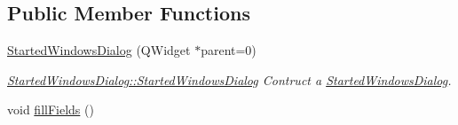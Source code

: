 \subsection*{Public Member Functions}
\begin{DoxyCompactItemize}
\item 
\hyperlink{classGui_1_1Dialogs_1_1StartedWindowsDialog_a978449729fbfc503919f29d1d2c7b4f6}{Started\+Windows\+Dialog} (Q\+Widget $\ast$parent=0)
\begin{DoxyCompactList}\small\item\em \hyperlink{classGui_1_1Dialogs_1_1StartedWindowsDialog_a978449729fbfc503919f29d1d2c7b4f6}{Started\+Windows\+Dialog\+::\+Started\+Windows\+Dialog} Contruct a \hyperlink{classGui_1_1Dialogs_1_1StartedWindowsDialog}{Started\+Windows\+Dialog}. \end{DoxyCompactList}\item 
\hypertarget{classGui_1_1Dialogs_1_1StartedWindowsDialog_a30d97171779c86ecc497ef6990829fca}{}void \hyperlink{classGui_1_1Dialogs_1_1StartedWindowsDialog_a30d97171779c86ecc497ef6990829fca}{fill\+Fields} ()\label{classGui_1_1Dialogs_1_1StartedWindowsDialog_a30d97171779c86ecc497ef6990829fca}


\end{DoxyCompactItemize}
